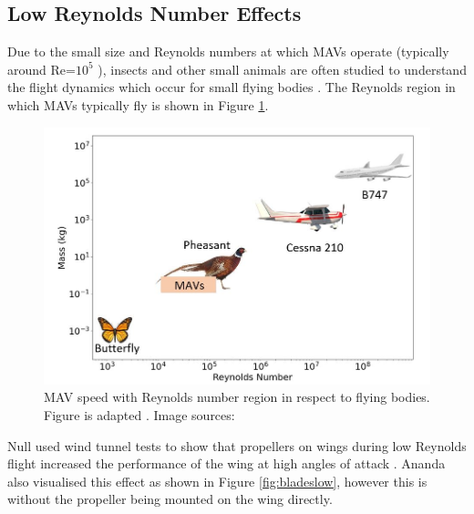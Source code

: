 \subsection{Low Reynolds Number Effects }

\label{sec:LowReynolds}
Due to the small size and Reynolds numbers at which MAVs operate (typically around Re=$10^5$ \cite{Huq2009} \cite{Winslow2018}), insects and other small animals are often studied to understand the flight dynamics which occur for small flying bodies \cite{Liu2009}. The Reynolds region in which MAVs typically fly is shown in Figure \ref{fig:MAVsizes}.

\begin{figure}[H]
  \centering
  \includegraphics[width=\linewidth]{03_LiteratureReview/Figs/Reynolds.JPG}
  \caption{MAV speed with Reynolds number region in respect to flying bodies. Figure is adapted \cite{reynoldsFigure}. Image sources: \cite{butterfly} \cite{pheasant} \cite{cess} \cite{b474} }
  \label{fig:MAVsizes}
\end{figure}

 Null used wind tunnel tests to show that propellers on wings during low Reynolds flight increased the performance of the wing at high angles of attack \cite{Null2005}. Ananda also visualised this effect as shown in Figure \ref{fig:bladeslow}, however this is without the propeller being mounted on the wing directly.  

